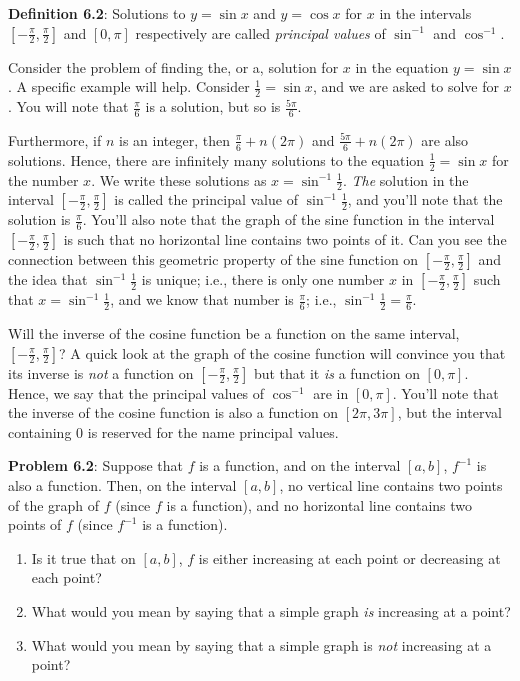 \documentclass[english]{book}
\begin{document}
\textbf{Definition 6.2}: Solutions to $y = \sin x$ and $y = \cos x$ for $x$ in the intervals $[-\frac{\pi}{2},\frac{\pi}{2}]$ and $[0,\pi]$ respectively are called \emph{principal values} of $\sin^{-1}$ and $\cos^{-1}$.

\vspace{0.3cm}

Consider the problem of finding the, or a, solution for $x$ in the equation $y = \sin x$. A specific example will help. Consider $\frac{1}{2} = \sin x$, and we are asked to solve for $x$. You will note that $\frac{\pi}{6}$ is a solution, but so is $\frac{5\pi}{6}$.

Furthermore, if $n$ is an integer, then $\frac{\pi}{6}+n(2\pi)$ and $\frac{5\pi}{6}+n(2\pi)$ are also solutions. Hence, there are infinitely many solutions to the equation $\frac{1}{2} = \sin x$ for the number $x$. We write these solutions as $x = \sin^{-1}\frac{1}{2}$. \emph{The} solution in the interval $[-\frac{\pi}{2},\frac{\pi}{2}]$ is called the principal value of $\sin^{-1} \frac{1}{2}$, and you'll note that the solution is $\frac{\pi}{6}$. You'll also note that the graph of the sine function in the interval $[-\frac{\pi}{2},\frac{\pi}{2}]$ is such that no horizontal line contains two points of it. Can you see the connection between this geometric property of the sine function on $[-\frac{\pi}{2},\frac{\pi}{2}]$ and the idea that $\sin^{-1} \frac{1}{2}$ is unique; i.e., there is only one number $x$ in $[-\frac{\pi}{2},\frac{\pi}{2}]$ such that $x = \sin^{-1} \frac{1}{2}$, and we know that number is $\frac{\pi}{6}$; i.e., $\sin^{-1} \frac{1}{2} = \frac{\pi}{6}$.

Will the inverse of the cosine function be a function on the same interval, $[-\frac{\pi}{2},\frac{\pi}{2}]$? A quick look at the graph of the cosine function will convince you that its inverse is \emph{not} a function on $[-\frac{\pi}{2},\frac{\pi}{2}]$  but that it \emph{is} a function on $[0,\pi]$. Hence, we say that the principal values of $\cos^{-1}$ are in $[0,\pi]$. You'll note that the inverse of the cosine function is also a function on $[2\pi,3\pi]$, but the interval containing $0$ is reserved for the name principal values.

\vspace{0.3cm}

\textbf{Problem 6.2}: Suppose that $f$ is a function, and on the interval $[a,b]$, $f^{-1}$ is also a function. Then, on the interval $[a,b]$, no vertical line contains two points of the graph of $f$ (since $f$ is a function), and no horizontal line contains two points of $f$ (since $f^{-1}$ is a function).
\begin{enumerate}[\hspace{1cm}1)]
  \item Is it true that on $[a,b]$, $f$ is either increasing at each point or decreasing at each point?
  \item What would you mean by saying that a simple graph \emph{is} increasing at a point?
  \item What would you mean by saying that a simple graph is \emph{not} increasing at a point?
\end{enumerate}
\end{document}
